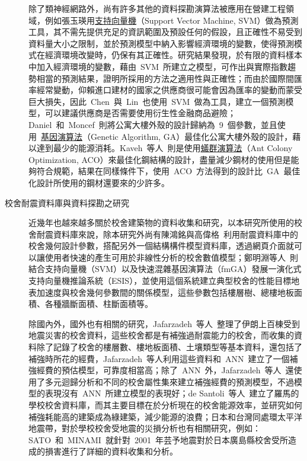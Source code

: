 \begin{description}
  除了類神經網路外，尚有許多其他的資料探勘演算法被應用在營建工程領域，例如張玉瑛\cite{chang2007master}用\underline{支持向量機}（Support Vector Machine, SVM）做為預測工具，其不需先提供充足的資訊範圍及預設任何的假設，且正確性不易受到資料量大小之限制，並於預測模型中納入影響經濟環境的變數，使得預測模式在經濟環境改變時，仍保有其正確性。研究結果發現，於有限的資料樣本中加入經濟環境的變數，藉由~SVM~所建立之模型，可作出與實際指數趨勢相當的預測結果，證明所採用的方法之適用性與正確性；而由於國際間匯率經常變動，仰賴進口建材的國家之供應商很可能會因為匯率的變動而蒙受巨大損失，因此~Chen~與~Lin\cite{chen2010developing}~也使用~SVM~做為工具，建立一個預測模型，可以建議供應商是否需要使用衍生性金融商品避險；Daniel~和~Moncef\cite{tuhus2010genetic}~則將公寓大樓外殼的設計歸納為~9~個參數，並且使用~\underline{基因演算法}（Genetic Algorithm, GA）最佳化公寓大樓外殼的設計，藉以達到最少的能源消耗。Kaveh~等人\cite{kaveh2010performance}~則是使用\underline{蟻群演算法}（Ant Colony Optimization, ACO）來最佳化鋼結構的設計，盡量減少鋼材的使用但是能夠符合規範，結果在同樣條件下，使用~ACO~方法得到的設計比~GA~最佳化設計所使用的鋼材還要來的少許多。

  \item[校舍耐震資料庫與資料探勘之研究]
  近幾年也越來越多關於校舍建築物的資料收集和研究，以本研究所使用的校舍耐震資料庫來說，除本研究外尚有陳鴻銘與高偉格\cite{chen2008computer}~利用耐震資料庫中的校舍幾何設計參數，搭配另外一個結構構件模型資料庫，透過網頁介面就可以讓使用者快速的產生可用於非線性分析的校舍數值模型；鄭明淵等人\cite{chen2012seismic}~則結合支持向量機（SVM）以及快速混雜基因演算法（fmGA）發展一演化式支持向量機推論系統（ESIS），並使用這個系統建立典型校舍的性能目標地表加速度與校舍幾何參數間的關係模型，這些參數包括樓層樹、總樓地板面積、各種牆斷面積、柱斷面積等。

  除國內外，國外也有相關的研究，Jafarzadeh~等人\cite{jafarzadeh2013application}~整理了伊朗上百棟受到地震災害的校舍資料，這些校舍都是有補強過耐震能力的校舍，而收集的資料除了記錄了校舍的樓層數、樓地板面積、土壤類型等基本資料，還包括了補強時所花的經費，Jafarzadeh~等人利用這些資料和~ANN~建立了一個補強經費的預估模型，可靠度相當高；除了~ANN~外，Jafarzadeh~等人\cite{jafarzadeh2013predicting}~還使用了多元迴歸分析和不同的校舍屬性集來建立補強經費的預測模型，不過模型的表現沒有~ANN~所建立模型的表現好；de Santoli~等人\cite{de2014energy}~建立了羅馬的學校校舍資料庫，而其主要目標在於分析現在的校舍能源效率，並研究如何補強耗能高的建築成為綠建築，減少能源的浪費；日本和台灣同處環太平洋地震帶，對於學校校舍受地震的災損分析也有相關研究，例如：SATO~和~MINAMI\cite{SATOShinji:2004-12}~就針對~2001~年芸予地震對於日本廣島縣校舍受所造成的損害進行了詳細的資料收集和分析。






\end{description}